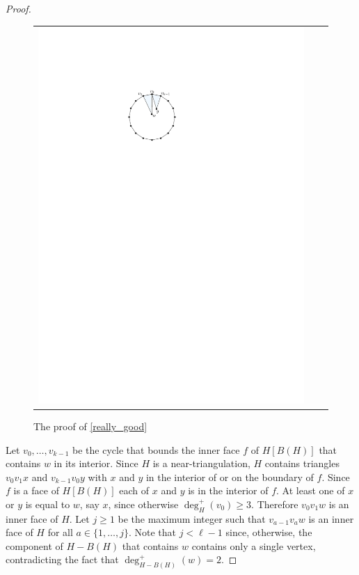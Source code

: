 \documentclass[12pt]{article}
\theoremstyle{definition}
\begin{document}
\begin{proof}
\begin{figure}
\begin{center}
\begin{tabular}{ccc}
        \includegraphics[page=3]{figs/really_good}
      \end{tabular}
    \end{center}
    \caption{The proof of \cref{really_good}}
    \label{really_good_fig}
  \end{figure}

  Let $v_0,\ldots,v_{k-1}$ be the cycle that bounds the inner face $f$ of $H[B(H)]$ that contains $w$ in its interior.  Since $H$ is a near-triangulation, $H$ contains triangles $v_0v_1x$ and $v_{k-1}v_0 y$ with $x$ and $y$ in the interior of or on the boundary of $f$.  Since $f$ is a face of $H[B(H)]$ each of $x$ and $y$ is in the interior of $f$.  At least one of $x$ or $y$ is equal to $w$, say $x$, since otherwise $\deg^+_H(v_0)\ge 3$.  Therefore $v_0v_1 w$ is an inner face of $H$.  Let $j\ge 1$ be the maximum integer such that $v_{a-1}v_{a}w$ is an inner face of $H$ for all $a\in\{1,\ldots,j\}$.  Note that $j<\ell-1$ since, otherwise, the component of $H-B(H)$ that contains $w$ contains only a single vertex, contradicting the fact that $\deg^+_{H-B(H)}(w)=2$.


\end{proof}
\end{document}
